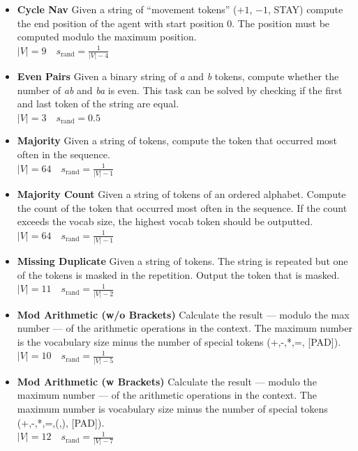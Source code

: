 \documentclass[dvipsnames]{article}
\begin{document}
\begin{appendix}
\begin{itemize}
    \item\textbf{Cycle Nav}
    Given a string of ``movement tokens'' ($+1$, $-1$, STAY) compute the end position of the agent with start position 0. The position must be computed modulo the maximum position. \\
    $|V|=9 \quad s_{\text{rand}}=\frac{1}{|V|-4}$

    \item\textbf{Even Pairs}
    Given a binary string of \textit{a} and \textit{b} tokens, compute whether the number of \textit{ab} and \textit{ba} is even.
    This task can be solved by checking if the first and last token of the string are equal. \\
    $|V|=3 \quad s_{\text{rand}}=0.5$

    \item\textbf{Majority}
    Given a string of tokens, compute the token that occurred most often in the sequence.\\
    $|V|=64 \quad s_{\text{rand}}=\frac{1}{|V| - 1}$
    
    \item\textbf{Majority Count}
    Given a string of tokens of an ordered alphabet. Compute the count of the token that occurred most often in the sequence. If the count exceeds the vocab size, the highest vocab token should be outputted.\\
    $|V|=64 \quad s_{\text{rand}}=\frac{1}{|V| - 1}$

    \item\textbf{Missing Duplicate}
    Given a string of tokens. The string is repeated but one of the tokens is masked in the repetition. Output the token that is masked. \\
    $|V|=11 \quad s_{\text{rand}}=\frac{1}{|V| - 2}$

    \item\textbf{Mod Arithmetic (w/o Brackets)}
    Calculate the result --- modulo the max number --- of the arithmetic operations in the context. The maximum number is the vocabulary size minus the number of special tokens (+,-,*,=, [PAD]). \\
    $|V|=10 \quad s_{\text{rand}}=\frac{1}{|V|-5}$

    \item\textbf{Mod Arithmetic (w Brackets)}
    Calculate the result --- modulo the maximum number --- of the arithmetic operations in the context. The maximum number is vocabulary size minus the number of special tokens (+,-,*,=,(,), [PAD]). \\
    $|V|=12 \quad s_{\text{rand}}=\frac{1}{|V|-7}$


\end{itemize}
\end{appendix}
\end{document}
